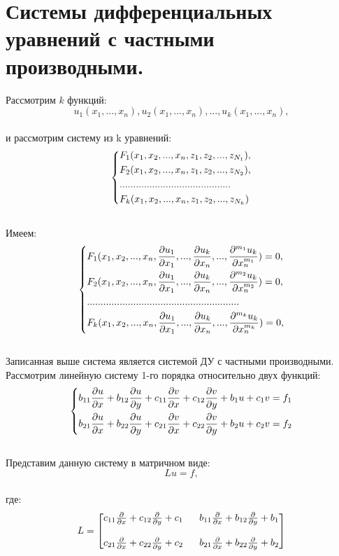 \documentclass[../main.tex]{subfiles}
\begin{document}
\section{Системы дифференциальных уравнений с частными производными.}
Рассмотрим $k$ функций:
$$u_1(x_1,...,x_n),u_2(x_1,...,x_n),...,u_k(x_1,...,x_n),$$ \\
и рассмотрим систему из k уравнений:
$$\begin{dcases}
		F_1(x_1, x_2,..., x_n, z_1, z_2,..., z_{N_1}), \\
		F_2(x_1, x_2,..., x_n, z_1, z_2,..., z_{N_2}), \\
		.........................................      \\
		F_k(x_1, x_2,..., x_n, z_1, z_2,..., z_{N_k})
	\end{dcases} $$ \\
Имеем:
$$\begin{dcases}
		F_1(x_1, x_2,..., x_n, \frac{\partial u_1}{\partial x_1},...,\frac{\partial u_k}{\partial x_n},..., \frac{\partial ^{m_1} u_k}{\partial x^{m_1}_n}) = 0, \\
		F_2(x_1, x_2,..., x_n, \frac{\partial u_1}{\partial x_1},...,\frac{\partial u_k}{\partial x_n},..., \frac{\partial ^{m_2} u_k}{\partial x^{m_2}_n}) = 0, \\
		........................................................                                                                 \\
		F_k(x_1, x_2,..., x_n, \frac{\partial u_1}{\partial x_1},...,\frac{\partial u_k}{\partial x_n},..., \frac{\partial ^{m_k} u_k}{\partial x^{m_k}_n}) = 0, \\
	\end{dcases} $$ \\
Записанная выше система является системой ДУ с частными производными.\\
Рассмотрим линейную систему 1-го порядка относительно двух функций:\\
$$
	\begin{dcases}
		b_{11}\frac{\partial u}{\partial x} + b_{12}\frac{\partial u}{\partial y} + c_{11}\frac{\partial v}{\partial x} + c_{12}\frac{\partial v}{\partial y}+b_1u + c_1v = f_1 \\
		b_{21}\frac{\partial u}{\partial x} + b_{22}\frac{\partial u}{\partial y} + c_{21}\frac{\partial v}{\partial x} + c_{22}\frac{\partial v}{\partial y}+b_2u + c_2v = f_2
	\end{dcases}$$\\
Представим данную систему в матричном виде:\\
$$Lu = f,$$ \\
где:
$$
	L = \begin{bmatrix}
		c_{11}\pderiv{}{x} + c_{12}\pderiv{}{y} + c_1 \  & \ b_{11}\pderiv{}{x} + b_{12}\pderiv{}{y} + b_1 \\ \\
		c_{21}\pderiv{}{x} + c_{22}\pderiv{}{y} + c_2 \  & \ b_{21}\pderiv{}{x} + b_{22}\pderiv{}{y} + b_2
	\end{bmatrix}
$$ \\
\end{document}
